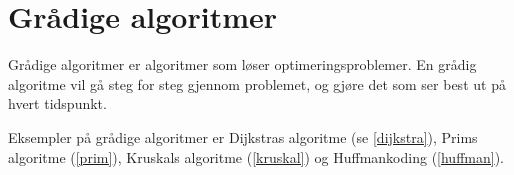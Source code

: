 \section{Grådige algoritmer}
Grådige algoritmer er algoritmer som løser optimeringsproblemer. En grådig algoritme vil gå steg for steg gjennom problemet, og gjøre det som ser best ut på hvert tidspunkt.

Eksempler på grådige algoritmer er Dijkstras algoritme (se \ref{dijkstra}), Prims algoritme (\ref{prim}), Kruskals algoritme (\ref{kruskal}) og Huffmankoding (\ref{huffman}).
